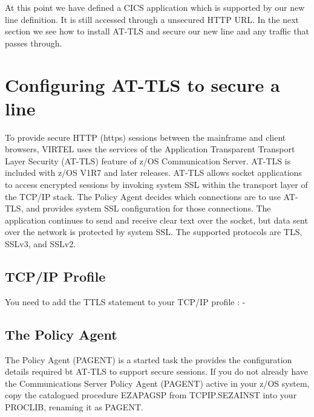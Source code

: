 \documentclass[letterpaper,10pt,english]{sphinxmanual}
\begin{document}
At this point we have defined a CICS application which is supported by our new line definition. It is still accessed through a unsecured HTTP URL. In the next section we see how to install AT-TLS and secure our new line and any traffic that passes through.


\section{Configuring AT-TLS to secure a line}
\label{\detokenize{TN202002:configuring-at-tls-to-secure-a-line}}
To provide secure HTTP (https) sessions between the mainframe and client browsers, VIRTEL uses the services of the Application Transparent Transport Layer Security (AT-TLS) feature of z/OS Communication Server. AT-TLS is included with z/OS V1R7 and later releases.  AT-TLS allows socket applications to access encrypted sessions by invoking system SSL within the transport layer of the TCP/IP stack. The Policy Agent decides which connections are to use AT-TLS, and provides system SSL configuration for those connections. The application continues to send and receive clear text over the socket, but data sent over the network is protected by system SSL. The supported protocols are TLS, SSLv3, and SSLv2.


\subsection{TCP/IP Profile}
\label{\detokenize{TN202002:tcp-ip-profile}}
You need to add the TTLS statement to your TCP/IP profile : -

\begin{sphinxVerbatim}[commandchars=\\\{\}]
           
\end{sphinxVerbatim}


\subsection{The Policy Agent}
\label{\detokenize{TN202002:the-policy-agent}}
The Policy Agent (PAGENT) is a started task the provides the configuration details required bt AT-TLS to support secure sessions. If you do not already have the Communications Server Policy Agent (PAGENT) active in your z/OS system, copy the catalogued procedure EZAPAGSP from TCPIP.SEZAINST into your PROCLIB, renaming it as PAGENT.
\end{document}
